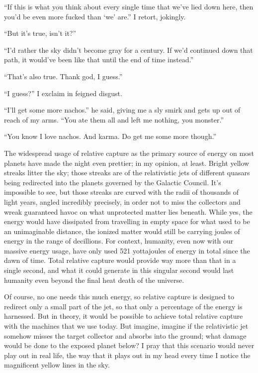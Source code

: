 \documentclass{book}
\begin{document}
			``If this is what you think about every single time that we've lied down here, then
			you'd be even more fucked than `we' are.'' I retort, jokingly.

			``But it's true, isn't it?''

			``I'd rather the sky didn't become gray for a century. If we'd continued down that
			path, it would've been like that until the end of time instead.''

			``That's also true. Thank god, I guess.''

			``I guess?'' I exclaim in feigned disgust.

			``I'll get some more nachos.'' he said, giving me a sly smirk and gets up out of reach
			of my arms. ``You ate them all and left me nothing, you monster.''

			``You know I love nachos. And karma. Do get me some more though.''

			The widespread usage of relative capture as the primary source of energy on most
			planets have made the night even prettier; in my opinion, at least. Bright yellow
			streaks litter the sky; those streaks are of the relativistic jets of different quasars
			being redirected into the planets governed by the Galactic Council. It's impossible to
			see, but those streaks are curved with the radii of thousands of light years, angled incredibly
			precisely, in order not to miss the collectors and wreak guaranteed havoc on what
			unprotected matter lies beneath. While yes, the energy would have dissipated from
			travelling in empty space for what used to be an unimaginable distance, the ionized
			matter would still be carrying joules of energy in the range of decillions. For
			context, humanity, even now with our massive energy usage, have only used 521
			yottajoules of energy in total since the dawn of time. Total relative capture would
			provide way more than that in a single second, and what it could generate in this singular
			second would last humanity even beyond the final heat death of the universe.

			Of course, no one needs this much energy, so relative capture is designed to redirect
			only a small part of the jet, so that only a percentage of the energy is harnessed.
			But in theory, it would be possible to achieve total relative capture with the machines
			that we use today. But imagine, imagine if the relativistic jet somehow misses the
			target collector and absorbs into the ground; what damage would be done to the exposed
			planet below? I pray that this scenario would never play out in real life, the way that
			it plays out in my head every time I notice the magnificent yellow lines in the sky.
\end{document}

